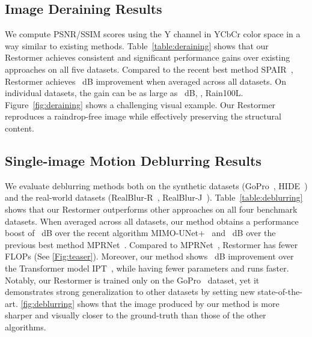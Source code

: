 \documentclass[10pt,twocolumn,letterpaper]{article}
\def\xnet{Restormer\xspace}
\begin{document}
 

\subsection{Image Deraining Results}
We compute PSNR/SSIM scores using the Y channel in YCbCr color space in a way similar to 
existing methods\cite{mspfn2020,Zamir_2021_CVPR_mprnet,purohit2021spatially_spair}.
Table~\ref{table:deraining} shows that 
our \xnet achieves consistent and significant performance gains over existing approaches on all five datasets. 
Compared to the recent best method SPAIR~\cite{purohit2021spatially_spair}, \xnet achieves ~dB improvement when averaged across all datasets. On individual datasets, the gain can be as large as ~dB, \eg, Rain100L.
Figure~\ref{fig:deraining} shows a challenging visual example. Our \xnet reproduces a raindrop-free image while effectively preserving the structural content.










\subsection{Single-image Motion Deblurring Results}
We evaluate deblurring methods both on the synthetic datasets (GoPro~\cite{gopro2017}, HIDE~\cite{shen2019human}) and the real-world datasets (RealBlur-R~\cite{rim_2020_realblur}, RealBlur-J~\cite{rim_2020_realblur}).
Table~\ref{table:deblurring} shows that our \xnet outperforms other approaches on all four benchmark datasets. 
When averaged across all datasets, our method obtains {a} performance boost of ~dB over the recent algorithm MIMO-UNet+~\cite{cho2021rethinking_mimo} and ~dB over the previous best method MPRNet~\cite{Zamir_2021_CVPR_mprnet}.
Compared to MPRNet~\cite{Zamir_2021_CVPR_mprnet}, \xnet has  fewer FLOPs (See \cref{Fig:teaser}). 
Moreover, our method shows ~dB improvement over the Transformer model IPT~\cite{chen2021IPT}, while having  fewer parameters and runs  faster. 
Notably, our \xnet is trained only on the GoPro~\cite{gopro2017} dataset, yet it demonstrates strong generalization to other datasets by setting new state-of-the-art. 
\cref{fig:deblurring} shows that the image produced by our method is more sharper and visually closer to the ground-truth than those of the other algorithms.  
\end{document}
